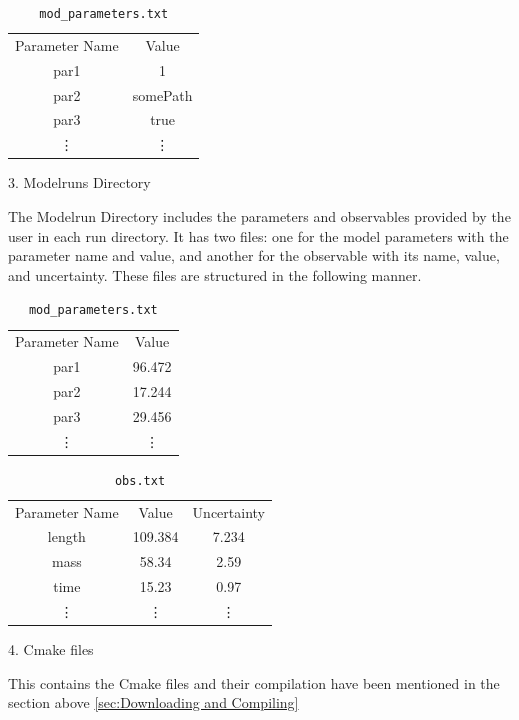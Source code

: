 \documentclass[12pt]{article}
\numberwithin{equation}{section}
\numberwithin{figure}{section}
\begin{document}
\begin{table}[!h]
    \centering
    \begin{tabular}{c|c}
         Parameter Name & Value \\
         par1 & 1 \\
         par2 & somePath \\
         par3 & true \\
          \vdots & \vdots 
    \end{tabular}
    \caption{{\tt{mod\_parameters.txt}}}
    \label{tab:my_label}
\end{table}

\newpage

3. Modelruns Directory

The Modelrun Directory includes the parameters and observables provided by the user in each run directory. It has two files: one for the model parameters with the parameter name and value, and another for the observable with its name, value, and uncertainty. These files are structured in the following manner.

\begin{table}[!h]
    \centering
    \begin{tabular}{c|c}
         Parameter Name & Value \\
         par1 & 96.472 \\
         par2 & 17.244 \\
         par3 & 29.456 \\
          \vdots & \vdots 
    \end{tabular}
    \caption{{\tt{mod\_parameters.txt}}}
    \label{tab:my_label}
\end{table}

\begin{table}[!h]
    \centering
    \begin{tabular}{c|c|c}
         Parameter Name & Value & Uncertainty\\
         length & 109.384 & 7.234\\
         mass & 58.34 & 2.59 \\
         time & 15.23 & 0.97 \\
          \vdots & \vdots & \vdots
    \end{tabular}
    \caption{{\tt{obs.txt}}}
    \label{tab:my_label}
\end{table}

4. Cmake files 

This contains the Cmake files and their compilation have been mentioned in the section above \ref{sec:Downloading and Compiling} 
\end{document}
